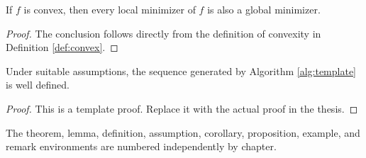\begin{lemma}\label{lem:basic}
If $f$ is convex, then every local minimizer of $f$ is also a global minimizer.
\end{lemma}

\begin{proof}
The conclusion follows directly from the definition of convexity in Definition \ref{def:convex}.
\end{proof}

\begin{theorem}\label{thm:template}
Under suitable assumptions, the sequence generated by Algorithm \ref{alg:template} is well defined.
\end{theorem}

\begin{proof}
This is a template proof. Replace it with the actual proof in the thesis.
\end{proof}

\begin{remark}
The theorem, lemma, definition, assumption, corollary, proposition, example, and remark environments are numbered independently by chapter.
\end{remark}
